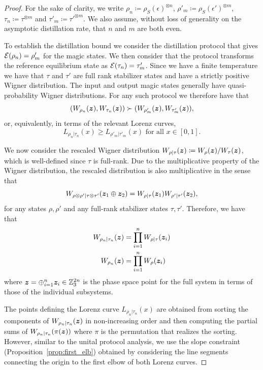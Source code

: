 \documentclass[pra,
aps,
twocolumn,
superscriptaddress,
groupedaddress,
nofootinbib,
reprint
]{revtex4-1}
\begin{document}
\begin{proof}
	For the sake of clarity, we write $\rho_n \coloneqq \rho_S(\epsilon)^{\otimes n}$, $\rho'_m \coloneqq \rho_S(\epsilon')^{\otimes m}$, $\tau_n \coloneqq \tau^{\otimes m}$ and $\tau'_m \coloneqq \tau'^{\otimes m}$.  We also assume, without loss of generality on the asymptotic distillation rate, that $n$ and $m$ are both even.

To establish the distillation bound we consider the distillation protocol that gives ${\mathcal E}( \rho_n) = \rho'_m$ for the magic states. 
We then consider that the protocol transforms the reference equilibrium state as ${\mathcal E}( \tau_n) = \tau'_m$.
Since we have a finite temperature we have that $\tau$ and $\tau'$ are full rank stabilizer states and have a strictly positive Wigner distribution. The input and output magic states generally have quasi-probability Wigner distributions. 
For any such protocol we therefore have that
\begin{equation}
	( W_{\rho_n}(\bm{z}), W_{\tau_n}(\bm{z}) ) \succ ( W_{\rho'_m}(\bm{z}), W_{\tau'_m}(\bm{z}) ),
\end{equation}
or, equivalently, in terms of the relevant Lorenz curves,
\begin{equation}
	L_{\rho_n |\tau_n}(x) \ge L_{\rho'_m |\tau'_m}(x) \mbox{ for all } x \in [0,1].
\end{equation}

We now consider the rescaled Wigner distribution $W_{\rho | \tau}(\bm{z}) \coloneqq W_\rho(\bm{z})/W_\tau(\bm{z})$, which is well-defined since $\tau$ is full-rank. 
Due to the multiplicative property of the Wigner distribution, the rescaled distribution is also multiplicative in the sense that
\begin{equation}
	W_{\rho \otimes \rho' | \tau \otimes \tau'} (\bm{z}_1 \oplus \bm{z}_2) = W_{\rho | \tau}(\bm{z}_1)W_{\rho' | \tau'}(\bm{z}_2),
\end{equation}
for any states $\rho, \rho'$ and any full-rank stabilizer states $\tau, \tau'$.
Therefore, we have that
\begin{align}
	W_{\rho_n |\tau_n} (\bm{z}) &= \prod_{i=1}^n W_{\rho|\tau}(\bm{z}_i)\\
	W_{\rho_n } (\bm{z}) &= \prod_{i=1}^n W_\rho(\bm{z}_i)
\end{align}
where $\bm{z} = \oplus_{i=1}^n \bm{z}_i \in \mathbb{Z}_3^{2n}$ is the phase space point for the full system in terms of those of the individual subsystems.

The points defining the Lorenz curve $L_{\rho_n |\tau_n}(x)$ are obtained from sorting the components of $W_{\rho_n |\tau_n}(\bm{z})$ in non-increasing order and then computing the partial sums of $W_{\rho_n |\tau_n}(\pi(\bm{z}))$ where $\pi$ is the permutation that realizes the sorting. 
However, similar to the unital protocol analysis, we use the slope constraint (Proposition~\ref{prop:first_elb}) obtained by considering the line segments connecting the origin to the first elbow of both Lorenz curves.


\end{proof}
\end{document}
